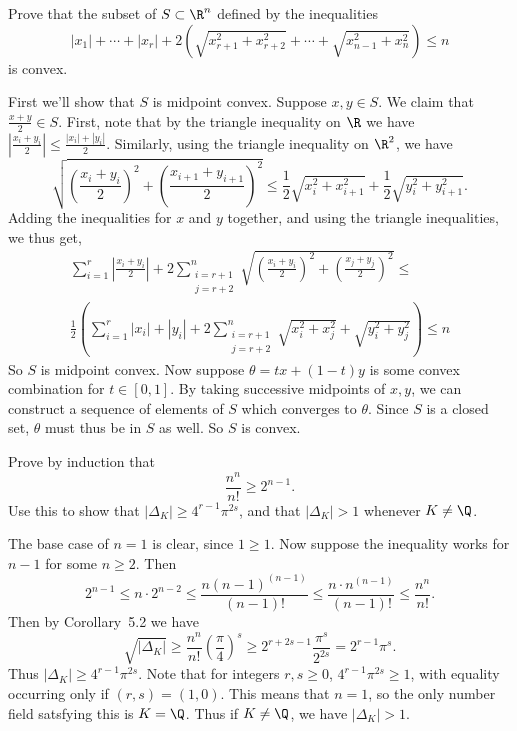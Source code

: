 \documentclass[11pt,letterpaper]{article}
\begin{document}
\begin{cproblem}{5.4}
    Prove that the subset of $S\subset \R^n$ defined by the inequalities
    \[
        |x_1|+\cdots+|x_r| + 2\left(\sqrt{x^2_{r+1} + x^2_{r+2}}+\cdots +\sqrt{x^2_{n-1} + x^2_n}\right)\leq n
    \] 
    is convex.
\end{cproblem}
\begin{solution}
    First we'll show that $S$ is midpoint convex. Suppose $x,y\in S$. We claim that $\frac{x+y}{2}\in S$. First, note that by the triangle inequality on $\R$ we have $\left|\frac{x_i+y_i}{2}\right|\leq \frac{|x_i|+|y_i|}{2}$. Similarly, using the triangle inequality on $\R^2$, we have
    \[
        \sqrt{\left(\frac{x_i+y_i}{2}\right)^2 + \left(\frac{x_{i+1}+y_{i+1}}{2}\right)^2} \leq \frac{1}{{2}}\sqrt{x_i^2+x_{i+1}^2} + \frac{1}{{2}}\sqrt{y_i^2+y_{i+1}^2}
    .\]  
    Adding the inequalities for $x$ and $y$ together, and using the triangle inequalities, we thus get,
    \[
        \begin{aligned}
            \sum^r_{i=1}\left|\frac{x_i+y_i}{2}\right| + 2\sum^{n}_{\substack{i=r+1\\ j = r+2}}\sqrt{\left(\frac{x_i+y_i}{2}\right)^2+\left(\frac{x_j+y_j}{2}\right)^2} \leq\\
            \frac{1}{2}\left(\sum^r_{i=1} |x_i|+|y_i| + 2\sum^n_{\substack{i=r+1\\ j = r+2}}\sqrt{x_i^2+x_j^2}+\sqrt{y_i^2+y_j^2}\right) \leq n
        \end{aligned}
    \] 
    So $S$ is midpoint convex. Now suppose $\theta = t x + (1-t)y$ is some convex combination for $t\in [0,1]$. By taking successive midpoints of $x,y$, we can construct a sequence of elements of $S$ which converges to $\theta$. Since $S$ is a closed set, $\theta$ must thus be in $S$ as well. So $S$ is convex. 
\end{solution}

\begin{cproblem}{5.5}
    Prove by induction that
    \[
        \frac{n^n}{n!}\geq 2^{n-1}
    .\] 
    Use this to show that $|\Delta_K| \geq 4^{r-1}\pi^{2s}$, and that $|\Delta_K| > 1$ whenever $K\neq \Q$.
\end{cproblem}

\begin{solution}
    The base case of $n=1$ is clear, since $1\geq 1$. Now suppose the inequality works for $n-1$ for some $n\geq 2$. Then
    \[
        2^{n-1} \leq n\cdot 2^{n-2} \leq \frac{n(n-1)^{(n-1)}}{(n-1)!} \leq \frac{n\cdot n^{(n-1)}}{(n-1)!} \leq \frac{n^n}{n!}
    .\] 
    Then by Corollary~5.2 we have
    \[
        \sqrt{|\Delta_K|} \geq \frac{n^n}{n!} \left(\frac{\pi}{4}\right)^s \geq 2^{r+2s-1} \frac{\pi^s}{2^{2s}} = 2^{r-1}\pi^s
    .\]
    Thus $|\Delta_K|\geq 4^{r-1}\pi^{2s}$. Note that for integers $r,s\geq 0$, $4^{r-1}\pi^{2s}\geq 1$, with equality occurring only if $(r,s)=(1,0)$. This means that $n=1$, so the only number field satsfying this is $K=\Q$. Thus if $K\neq \Q$, we have $|\Delta_K|>1$.
\end{solution}
\end{document}
